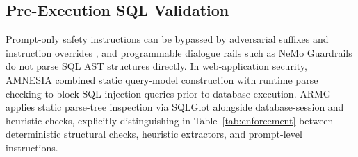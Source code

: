 \subsection{Pre-Execution SQL Validation}
Prompt-only safety instructions can be bypassed by adversarial suffixes and instruction overrides \cite{wei2023jailbroken, zou2023universal}, and programmable dialogue rails such as NeMo Guardrails \cite{rebedea2023nemoguardrails} do not parse SQL AST structures directly. In web-application security, AMNESIA \cite{halfond2005amnesia} combined static query-model construction with runtime parse checking to block SQL-injection queries prior to database execution. ARMG applies static parse-tree inspection via SQLGlot \cite{mao2023sqlglot} alongside database-session and heuristic checks, explicitly distinguishing in Table~\ref{tab:enforcement} between deterministic structural checks, heuristic extractors, and prompt-level instructions.

